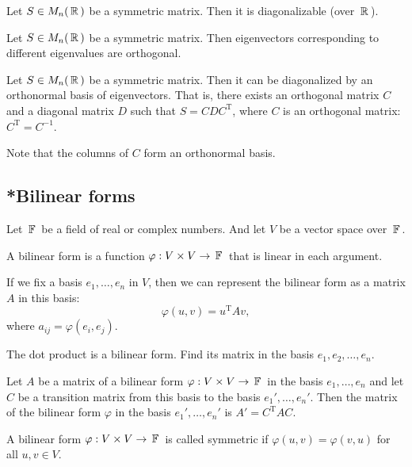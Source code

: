 \begin{lemma}
Let $S\in M_n(\,\mathbb{R}\,)$ be a symmetric matrix. Then it is diagonalizable (over $\,\mathbb{R}\,$).
\end{lemma}

\begin{lemma}
Let $S\in  M_n(\,\mathbb{R}\,)$ be a symmetric matrix. Then eigenvectors corresponding to different eigenvalues are orthogonal.
\end{lemma}

\begin{lemma}
Let $S\in M_n(\,\mathbb{R}\,)$ be a symmetric matrix. Then it can be diagonalized by an orthonormal basis of eigenvectors. That is, there exists an orthogonal matrix $C$ and a diagonal matrix $D$ such that $S = C D C^{\mathrm T}$, where $C$ is an orthogonal matrix: $C^{\mathrm T} = C^{-1}$.
\end{lemma}

Note that the columns of $C$ form an orthonormal basis.

\subsection{*Bilinear forms}

Let $\,\mathbb{F}\,$ be a field of real or complex numbers. And let $V$ be a vector space over $\,\mathbb{F}\,$.

\begin{definition}
A bilinear form is a function $\varphi: V \times V \to \,\mathbb{F}\,$ that is linear in each argument.
\end{definition}

If we fix a basis $e_1, \ldots, e_n$ in $V$, then we can represent the bilinear form as a matrix $A$ in this basis:
$$
\varphi(u, v) = u^{\mathrm T} A v,
$$
where $a_{ij} = \varphi(e_i, e_j)$.

\begin{example}
The dot product is a bilinear form. Find its matrix in the basis $e_1, e_2, \dots, e_n$.
\end{example}

\begin{lemma}
Let $A$ be a matrix of a bilinear form $\varphi: V \times V \to \,\mathbb{F}\,$ in the basis $e_1, \ldots, e_n$ and let $C$ be a transition matrix from this basis to the basis $e_1', \ldots, e_n'$. Then the matrix of the bilinear form $\varphi$ in the basis $e_1', \ldots, e_n'$ is $A' = C^{\mathrm T} A C$.
\end{lemma}

\begin{definition}
A bilinear form $\varphi: V \times V \to \,\mathbb{F}\,$ is called symmetric if $\varphi(u, v) = \varphi(v, u)$ for all $u, v \in V$.
\end{definition}

